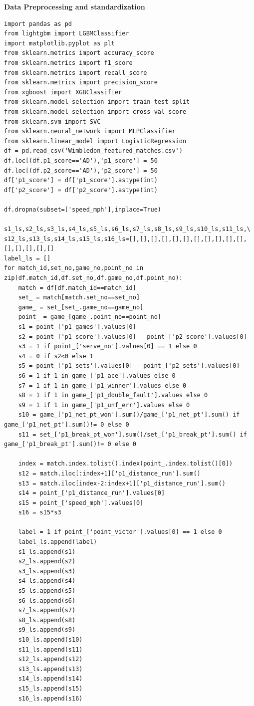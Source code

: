 \documentclass{article}
\begin{document}
\textbf{Data Preprocessing and standardization}
\begin{lstlisting}[caption={Data Preprocessing and standardization}, label=python-example]
import pandas as pd
from lightgbm import LGBMClassifier
import matplotlib.pyplot as plt
from sklearn.metrics import accuracy_score
from sklearn.metrics import f1_score
from sklearn.metrics import recall_score
from sklearn.metrics import precision_score
from xgboost import XGBClassifier
from sklearn.model_selection import train_test_split
from sklearn.model_selection import cross_val_score
from sklearn.svm import SVC
from sklearn.neural_network import MLPClassifier
from sklearn.linear_model import LogisticRegression
df = pd.read_csv('Wimbledon_featured_matches.csv')
df.loc[(df.p1_score=='AD'),'p1_score'] = 50
df.loc[(df.p2_score=='AD'),'p2_score'] = 50
df['p1_score'] = df['p1_score'].astype(int)
df['p2_score'] = df['p2_score'].astype(int)

df.dropna(subset=['speed_mph'],inplace=True)

s1_ls,s2_ls,s3_ls,s4_ls,s5_ls,s6_ls,s7_ls,s8_ls,s9_ls,s10_ls,s11_ls,\
s12_ls,s13_ls,s14_ls,s15_ls,s16_ls=[],[],[],[],[],[],[],[],[],[],[],[],[],[],[],[]
label_ls = []
for match_id,set_no,game_no,point_no in zip(df.match_id,df.set_no,df.game_no,df.point_no):
    match = df[df.match_id==match_id]
    set_ = match[match.set_no==set_no]
    game_ = set_[set_.game_no==game_no]
    point_ = game_[game_.point_no==point_no]
    s1 = point_['p1_games'].values[0]
    s2 = point_['p1_score'].values[0] - point_['p2_score'].values[0]
    s3 = 1 if point_['serve_no'].values[0] == 1 else 0
    s4 = 0 if s2<0 else 1
    s5 = point_['p1_sets'].values[0] - point_['p2_sets'].values[0]
    s6 = 1 if 1 in game_['p1_ace'].values else 0
    s7 = 1 if 1 in game_['p1_winner'].values else 0
    s8 = 1 if 1 in game_['p1_double_fault'].values else 0
    s9 = 1 if 1 in game_['p1_unf_err'].values else 0
    s10 = game_['p1_net_pt_won'].sum()/game_['p1_net_pt'].sum() if game_['p1_net_pt'].sum()!= 0 else 0
    s11 = set_['p1_break_pt_won'].sum()/set_['p1_break_pt'].sum() if game_['p1_break_pt'].sum()!= 0 else 0

    index = match.index.tolist().index(point_.index.tolist()[0])
    s12 = match.iloc[:index+1]['p1_distance_run'].sum()
    s13 = match.iloc[index-2:index+1]['p1_distance_run'].sum()
    s14 = point_['p1_distance_run'].values[0]
    s15 = point_['speed_mph'].values[0]
    s16 = s15*s3

    label = 1 if point_['point_victor'].values[0] == 1 else 0
    label_ls.append(label)
    s1_ls.append(s1)
    s2_ls.append(s2)
    s3_ls.append(s3)
    s4_ls.append(s4)
    s5_ls.append(s5)
    s6_ls.append(s6)
    s7_ls.append(s7)
    s8_ls.append(s8)
    s9_ls.append(s9)
    s10_ls.append(s10)
    s11_ls.append(s11)
    s12_ls.append(s12)
    s13_ls.append(s13)
    s14_ls.append(s14)
    s15_ls.append(s15)
    s16_ls.append(s16)


\end{lstlisting}
\end{document}
